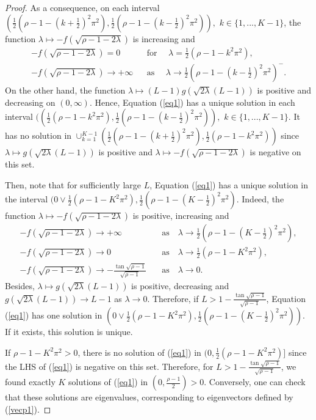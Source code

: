 \documentclass[11pt]{article}
\theoremstyle{plain}
\begin{document}
\begin{proof}
As a consequence, on each interval $\left(\frac{1}{2}(\rho-1-(k+\frac{1}{2})^2\pi^2),\frac{1}{2}(\rho-1-(k-\frac{1}{2})^2\pi^2)\right),$ $k\in\{ 1,...,K-1\}$, 
the function $\lambda\mapsto - f(\sqrt{\rho-1-2\lambda})$ is increasing and 
\begin{eqnarray*}
-f(\sqrt{\rho-1-2\lambda})=0  &&  \text{for } \quad\lambda=\frac{1}{2}(\rho-1-k^2\pi^2),\\
-f(\sqrt{\rho-1-2\lambda})\to+\infty  &&\text{as } \quad \lambda\to \frac{1}{2}\left(\rho-1-\left(k-\frac{1}{2}\right)^2\pi^2\right)^-.
\end{eqnarray*}
On the other hand, the function  $\lambda\mapsto (L-1)g(\sqrt{2\lambda}(L-1))$ is positive and decreasing on $(0,\infty)$. Hence, Equation (\ref{eq1}) has a unique solution in each interval $(\left(\frac{1}{2}(\rho-1-k^2\pi^2),\frac{1}{2}(\rho-1-(k-\frac{1}{2})^2\pi^2)\right),$ $k\in\{ 1,...,K-1\}$. It has no solution in  $\cup_{k=1}^{K-1}\left(\frac{1}{2}(\rho-1-(k+\frac{1}{2})^2\pi^2),\frac{1}{2}(\rho-1-k^2\pi^2)\right)$ since $\lambda\mapsto g(\sqrt{2\lambda}(L-1))$ is positive  and $\lambda\mapsto -f(\sqrt{\rho-1-2\lambda})$ is negative on this set.


Then, note that for sufficiently large $L$, Equation (\ref{eq1}) has a unique solution in the interval $(0\vee\frac{1}{2}(\rho-1-K^2\pi^2),\frac{1}{2}(\rho-1-(K-\frac{1}{2})^2\pi^2)$. Indeed, the function $\lambda\mapsto - f(\sqrt{\rho-1-2\lambda})$ is positive, increasing and 
\begin{align*}
-f(\sqrt{\rho-1-2\lambda})\to+\infty & \quad\text{as} \quad \lambda\to \frac{1}{2}\left(\rho-1-\left(K-\frac{1}{2}\right)^2\pi^2\right),\\
-f(\sqrt{\rho-1-2\lambda})\to 0 & \quad \text{as} \quad \lambda\to \frac{1}{2}(\rho-1-K^2\pi^2),\\
-f(\sqrt{\rho-1-2\lambda})\to -\frac{\tan{\sqrt{\rho-1}}}{\sqrt{\rho-1}} & \quad\text{as} \quad \lambda\to 0.
\end{align*}
Besides, $\lambda\mapsto g(\sqrt{2\lambda}(L-1))$ is positive, decreasing and $g(\sqrt{2\lambda}(L-1))\rightarrow L-1$ as $\lambda\to 0$. Therefore, if $L>1-\frac{\tan\sqrt{\rho-1}}{\sqrt{\rho-1}}$, Equation  (\ref{eq1}) has one solution in $(0\vee\frac{1}{2}(\rho-1-K^2\pi^2),\frac{1}{2}(\rho-1-(K-\frac{1}{2})^2\pi^2))$. If it exists, this solution is unique. 

If $\rho-1-K^2\pi^2>0$, there is no solution of (\ref{eq1}) in $(0,\frac{1}{2}(\rho-1-K^2\pi^2)]$ since the LHS of (\ref{eq1}) is negative on this set. 
Therefore, for $L>1-\frac{\tan\sqrt{\rho-1}}{\sqrt{\rho-1}}$, we found exactly $K$ solutions of (\ref{eq1}) in $(0,\frac{\rho-1}{2})>0$. Conversely, one can check that these solutions are eigenvalues, corresponding to eigenvectors defined by (\ref{vecp1}).




\end{proof}
\end{document}
